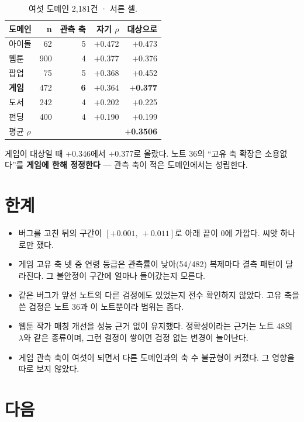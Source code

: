 \documentclass[10pt]{article}
\begin{document}
\begin{table}[t]
\centering\tsize
\caption{여섯 도메인 2,181건 · 서른 셀.}
\begin{tabular}{lrrrr}
\toprule
도메인 & n & 관측 축 & 자기 $\rho$ & 대상으로 \\
\midrule
아이돌 & 62 & 5 & $+$0.472 & $+$0.473 \\
웹툰 & 900 & 4 & $+$0.377 & $+$0.376 \\
팝업 & 75 & 5 & $+$0.368 & $+$0.452 \\
\textbf{게임} & 472 & \textbf{6} & $+$0.364 & \textbf{$+$0.377} \\
도서 & 242 & 4 & $+$0.202 & $+$0.225 \\
펀딩 & 400 & 4 & $+$0.190 & $+$0.199 \\
\midrule
\multicolumn{3}{l}{평균 $\rho$} & \multicolumn{2}{r}{\textbf{$+$0.3506}} \\
\bottomrule
\end{tabular}
\end{table}

게임이 대상일 때 $+$0.346에서 $+$0.377로 올랐다. 노트 36의 ``고유 축 확장은
소용없다''를 \textbf{게임에 한해 정정한다} --- 관측 축이 적은 도메인에서는
성립한다.

\section{한계}

\begin{itemize}[leftmargin=1.1em,itemsep=0.15em]
\item 버그를 고친 뒤의 구간이 $[+0.001,\ +0.011]$로 아래 끝이 0에 가깝다.
      씨앗 하나로만 쟀다.
\item 게임 고유 축 넷 중 연령 등급은 관측률이 낮아(54/482) 복제마다 결측 패턴이
      달라진다. 그 불안정이 구간에 얼마나 들어갔는지 모른다.
\item 같은 버그가 앞선 노트의 다른 검정에도 있었는지 전수 확인하지 않았다.
      고유 축을 쓴 검정은 노트 36과 이 노트뿐이라 범위는 좁다.
\item 웹툰 작가 매칭 개선을 성능 근거 없이 유지했다. 정확성이라는 근거는
      노트 48의 $\lambda$와 같은 종류이며, 그런 결정이 쌓이면 검정 없는 변경이
      늘어난다.
\item 게임 관측 축이 여섯이 되면서 다른 도메인과의 축 수 불균형이 커졌다.
      그 영향을 따로 보지 않았다.
\end{itemize}

\section{다음}
\end{document}
